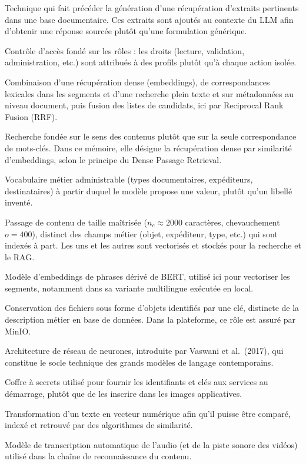 \documentclass[12pt,a4paper]{report}
\begin{document}
\begin{description}[style=unboxed, leftmargin=0pt, itemsep=0.55em, parsep=0.12em, font=\normalfont\bfseries]
  \item[RAG (\textit{Retrieval-Augmented Generation})] Technique qui fait précéder la génération d'une récupération d'extraits pertinents dans une base documentaire. Ces extraits sont ajoutés au contexte du LLM afin d'obtenir une réponse sourcée plutôt qu'une formulation générique.
  \item[RBAC (\textit{Role-Based Access Control})] Contrôle d'accès fondé sur les rôles : les droits (lecture, validation, administration, etc.) sont attribués à des profils plutôt qu'à chaque action isolée.
  \item[recherche hybride] Combinaison d'une récupération dense (embeddings), de correspondances lexicales dans les segments et d'une recherche plein texte et sur métadonnées au niveau document, puis fusion des listes de candidats, ici par Reciprocal Rank Fusion (RRF).
  \item[recherche sémantique] Recherche fondée sur le sens des contenus plutôt que sur la seule correspondance de mots-clés. Dans ce mémoire, elle désigne la récupération dense par similarité d'embeddings, selon le principe du Dense Passage Retrieval.
  \item[référentiel] Vocabulaire métier administrable (types documentaires, expéditeurs, destinataires) à partir duquel le modèle propose une valeur, plutôt qu'un libellé inventé.
  \item[segment (\textit{chunk})] Passage de contenu de taille maîtrisée ($n_{c}\approx 2000$ caractères, chevauchement $o=400$), distinct des champs métier (objet, expéditeur, type, etc.) qui sont indexés à part. Les uns et les autres sont vectorisés et stockés pour la recherche et le RAG.
  \item[Sentence-BERT] Modèle d'embeddings de phrases dérivé de BERT, utilisé ici pour vectoriser les segments, notamment dans sa variante multilingue exécutée en local.
  \item[stockage objet] Conservation des fichiers sous forme d'objets identifiés par une clé, distincte de la description métier en base de données. Dans la plateforme, ce rôle est assuré par MinIO.
  \item[Transformer] Architecture de réseau de neurones, introduite par Vaswani et al.\ (2017), qui constitue le socle technique des grands modèles de langage contemporains.
  \item[Vault] Coffre à secrets utilisé pour fournir les identifiants et clés aux services au démarrage, plutôt que de les inscrire dans les images applicatives.
  \item[vectorisation] Transformation d'un texte en vecteur numérique afin qu'il puisse être comparé, indexé et retrouvé par des algorithmes de similarité.
  \item[Whisper] Modèle de transcription automatique de l'audio (et de la piste sonore des vidéos) utilisé dans la chaîne de reconnaissance du contenu.
\end{description}
\end{document}
